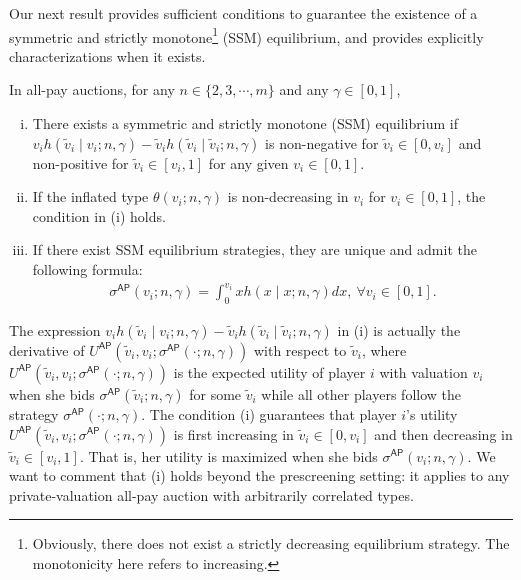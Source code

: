 Our next result provides sufficient conditions to guarantee the existence of a symmetric and strictly monotone\footnote{Obviously, there does not exist a strictly decreasing equilibrium strategy. The monotonicity here refers to increasing.} (SSM) equilibrium, and provides explicitly characterizations when it exists.

\begin{theorem}
\label{thm:strictlymonotone_equilibrium_allpay}
In all-pay auctions, for any $n\in \{2,3,\cdots,m\}$ and any $\gamma\in [0,1]$, 
\begin{enumerate}[(i)]
    \item There exists a symmetric and strictly monotone (SSM) equilibrium if $v_i h(\tilde{v}_i\mid v_i;n,\gamma) - \tilde{v}_i h(\tilde{v}_i\mid \tilde{v}_i;n,\gamma)$ is non-negative for $\tilde{v}_i\in [0,v_i]$ and non-positive for $\tilde{v}_i\in [v_i,1]$ for any given $v_i\in [0,1]$.
    \item If the inflated type $\theta(v_i;n,\gamma)$ is non-decreasing in $v_i$ for {} $v_i\in [0,1]$, the condition in (i) holds.
    \item If there exist SSM equilibrium strategies, they are unique and admit the following formula:
    \begin{align}
    \label{eq:SSM_equilibrium_all_pay}
        \sigma^{\mathsf{AP}}(v_i;n,\gamma)
  =\int_0^{v_i} x h(x\mid x;n,\gamma)dx,~ \forall v_i\in [0,1].
    \end{align}
\end{enumerate}
\end{theorem}

The expression $v_i h(\tilde{v}_i\mid v_i;n,\gamma) - \tilde{v}_i h(\tilde{v}_i\mid \tilde{v}_i;n,\gamma)$ in  (i) is actually the derivative of $U^{\mathsf{AP}}(\tilde{v}_i,v_i;\sigma^{\mathsf{AP}}(\cdot;n,\gamma))$ with respect to $\tilde{v}_i$, where $U^{\mathsf{AP}}(\tilde{v}_i,v_i;\sigma^{\mathsf{AP}}(\cdot;n,\gamma))$ is the expected utility of player $i$ with valuation $v_i$ when she bids $\sigma^{\mathsf{AP}}(\tilde{v}_i;n,\gamma)$ for some $\tilde{v}_i$ while all other players follow the strategy $\sigma^{\mathsf{AP}}(\cdot;n,\gamma)$. The condition (i) guarantees that player $i$'s utility $U^{\mathsf{AP}}(\tilde{v}_i,v_i;\sigma^{\mathsf{AP}}(\cdot;n,\gamma))$ is first increasing in $\tilde{v}_i\in [0,v_i]$ and then decreasing in $\tilde{v}_i\in [v_i,1]$. That is, her utility is maximized when she bids $\sigma^{\mathsf{AP}}(v_i;n,\gamma)$. We want to comment that  (i) holds beyond the prescreening setting: it applies to any private-valuation all-pay auction with arbitrarily correlated types.

